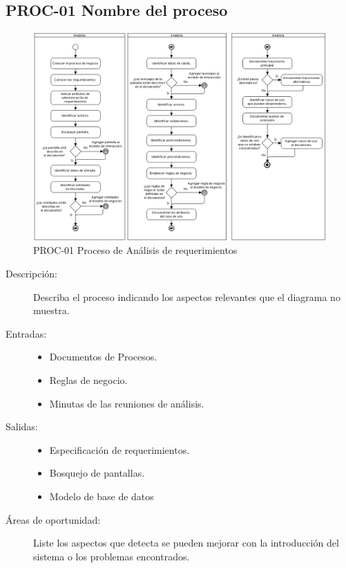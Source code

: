 



\subsection{PROC-01 Nombre del proceso}

\begin{figure}[htbp]
	\begin{center}
		\includegraphics[width=.7\textwidth]{images/proceso1}
		\caption{PROC-01 Proceso de Análisis de requerimientos}
		\label{fig:proceso1}
	\end{center}
\end{figure}

\begin{description}
	\item[Descripción:] Describa el proceso indicando los aspectos relevantes que el diagrama no muestra.
	\item[Entradas:] \cdtEmpty
        \begin{itemize}
			\item Documentos de Procesos.
			\item Reglas de negocio.
			\item Minutas de las reuniones de análisis.
        \end{itemize}
	\item[Salidas:] \cdtEmpty
        \begin{itemize}
			\item Especificación de requerimientos.
			\item Bosquejo de pantallas.
			\item Modelo de base de datos
        \end{itemize}	
    \item[Áreas de oportunidad:] Liste los aspectos que detecta se pueden mejorar con la introducción del sistema o los problemas encontrados.
\end{description}
